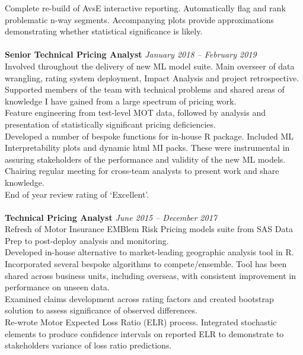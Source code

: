 \documentclass[11pt]{article}
\begin{document}
\begin{description}
\textbullet \quad Complete re-build of AvsE interactive reporting. Automatically flag and rank problematic n-way segments. Accompanying plots provide approximations demonstrating whether statistical significance is likely.
\\\\
\textbf{Senior Technical Pricing Analyst} \emph{January 2018 -- February 2019}\\
\textbullet \quad Involved throughout the delivery of new ML model suite. Main overseer of data wrangling, rating system deployment, Impact Analysis and project retrospective. \\
\textbullet \quad Supported members of the team with technical problems and shared areas of knowledge I have gained from a large spectrum of pricing work. \\
\textbullet \quad Feature engineering from test-level MOT data, followed by analysis and presentation of statistically significant pricing deficiencies. \\
\textbullet \quad Developed a number of bespoke functions for in-house R package. Included ML Interpretability plots and dynamic html MI packs. These were instrumental in assuring stakeholders of the performance and validity of the new ML models. \\
\textbullet \quad Chairing regular meeting for cross-team analysts to present work and share knowledge. \\
\textbullet \quad End of year review rating of `Excellent'.
\\\\
\textbf{Technical Pricing Analyst} \emph{June 2015 -- December 2017}\\
\textbullet \quad Refresh of Motor Insurance EMBlem Risk Pricing models suite from SAS Data Prep to post-deploy analysis and monitoring. \\
\textbullet \quad Developed in-house alternative to market-leading geographic analysis tool in R. Incorporated several bespoke algorithms to compete/ensemble. Tool has been shared across business units, including overseas, with consistent improvement in performance on unseen data. \\
\textbullet \quad Examined claims development across rating factors and created bootstrap solution to assess significance of observed differences. \\
\textbullet \quad Re-wrote Motor Expected Loss Ratio (ELR) process. Integrated stochastic elements to produce confidence intervals on reported ELR to demonstrate to stakeholders variance of loss ratio predictions.\\

\end{description}
\end{document}
